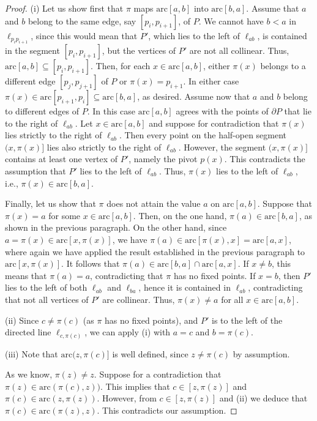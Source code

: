 \documentclass[11pt]{amsart}
\theoremstyle{remark}
\numberwithin{equation}{section}
\newcommand{\arc}{\mathrm{arc}}
\begin{document}
\begin{proof}
(i) Let us show first that $\pi$ maps $\arc[a,b]$ into   $\arc[b,a]$. Assume that $a$ and $b$ belong to the same edge, say $[p_i,p_{i+1}]$, of $P$. We cannot have $b<a$ in $\ell_{p_ip_{i+1}}$, since this would mean that $P'$, which lies to the left of $\ell_{ab}$, is contained in the segment 
$[p_i,p_{i+1}]$, but the vertices of $P'$ are not all collinear. Thus, $\arc[a,b]\subseteq [p_i,p_{i+1}]$. Then, for each $x\in \arc[a,b]$, 
either $\pi(x)$ belongs to a different edge $[p_j,p_{j+1}]$ of $P$  or $\pi(x)=p_{i+1}$. In either case  $\pi(x)\in \arc[p_{i+1},p_i]\subseteq \arc[b,a]$, as desired.  Assume now that $a$ and $b$ belong to different edges of $P$. In this case   $\arc[a,b]$ agrees with the points of $\partial P$ that lie to the right of $\ell_{ab}$. Let $x\in \arc[a,b]$ and   suppose for contradiction that $\pi(x)$ lies strictly to the right of $\ell_{ab}$. Then every point on the half-open segment $(x,\pi(x)]$ lies also strictly to the right of $\ell_{ab}$. However, the segment $(x,\pi(x)]$ contains at least one vertex of $P'$, namely the pivot $p(x)$. This contradicts the assumption that $P'$ lies to the left of $\ell_{ab}$. Thus, $\pi(x)$ lies to the  left of $\ell_{ab}$, i.e., $\pi(x)\in \arc[b,a]$.

Finally, let us show that $\pi$ does not attain the value $a$  on $\arc[a,b]$. Suppose that $\pi(x)=a$ for some $x\in \arc[a,b]$. Then, on the one hand,  $\pi(a)\in \arc[b,a]$, as shown in the previous paragraph.
On the other hand, since $a=\pi(x)\in \arc[x,\pi(x)]$, we have $\pi(a)\in \arc[\pi(x),x]=\arc[a,x]$, where again we have applied the result established in the previous paragraph to  $\arc[x,\pi(x)]$. It follows that $\pi(a)\in \arc[b,a]\cap \arc[a,x]$. If $x\neq b$, this means that $\pi(a)=a$, contradicting that $\pi$ has no fixed points. If $x=b$, then  $P'$ lies to the left of both $\ell_{ab}$ and $\ell_{ba}$, hence it is contained in $\ell_{ab}$, contradicting that not all vertices of $P'$ are collinear. Thus, $\pi(x)\neq a$ for all $x\in \arc[a,b]$.

(ii) Since $c\neq \pi(c)$ (as $\pi$ has no fixed points), and 
$P'$ is to the left of the directed line $\ell_{c,\pi(c)}$, we can apply (i) with $a=c$ and $b=\pi(c)$.

(iii) Note that $\arc(z,\pi(c)]$ is well defined, since  $z\neq \pi(c)$ by assumption. 

As we know, $\pi(z)\neq z$. Suppose for a contradiction that $\pi(z)\in \arc(\pi(c),z))$. 
This implies that   $c\in [z,\pi(z)]$ and $\pi(c)\in \arc(z,\pi(z))$. However, from  $c\in [z,\pi(z)]$  and (ii) we deduce that
$\pi(c)\in \arc(\pi(z), z)$. This contradicts our assumption.
\end{proof}
\end{document}
